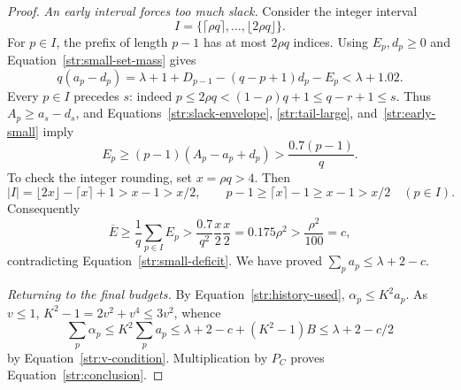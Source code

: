 \begin{proof}
\textit{An early interval forces too much slack.}
Consider the integer interval
\[
 I=\{\lceil\rho q\rceil,\ldots,\lfloor2\rho q\rfloor\}.
\]
For $p\in I$, the prefix of length $p-1$ has at most $2\rho q$ indices.
Using $E_p,d_p\ge0$ and Equation~\eqref{str:small-set-mass} gives
\begin{equation}\label{str:early-small}
 q(a_p-d_p)=\lambda+1+D_{p-1}-(q-p+1)d_p-E_p
 <\lambda+1.02.
\end{equation}
Every $p\in I$ precedes $s$: indeed
$p\le2\rho q<(1-\rho)q+1\le q-r+1\le s$.
Thus $A_p\ge a_s-d_s$, and Equations~\eqref{str:slack-envelope},
\eqref{str:tail-large}, and~\eqref{str:early-small} imply
\[
 E_p\ge(p-1)(A_p-a_p+d_p)>\frac{0.7(p-1)}q.
\]
To check the integer rounding, set $x=\rho q>4$.
Then
\[
 |I|=\lfloor2x\rfloor-\lceil x\rceil+1>x-1>x/2,
 \qquad p-1\ge\lceil x\rceil-1\ge x-1>x/2
 \quad(p\in I).
\]
Consequently
\[
 \overline E\ge\frac1q\sum_{p\in I}E_p
 >\frac{0.7}{q^2}\frac{x}{2}\frac{x}{2}
 =0.175\rho^2>\frac{\rho^2}{100}=c,
\]
contradicting Equation~\eqref{str:small-deficit}.  We have proved
$\sum_pa_p\le\lambda+2-c$.

\textit{Returning to the final budgets.}
By Equation~\eqref{str:history-used}, $\alpha_p\le K^2a_p$.
As $v\le1$, $K^2-1=2v^2+v^4\le3v^2$, whence
\[
 \sum_p\alpha_p
 \le K^2\sum_pa_p
 \le\lambda+2-c+(K^2-1)B
 \le\lambda+2-c/2
\]
by Equation~\eqref{str:v-condition}.  Multiplication by $P_C$ proves
Equation~\eqref{str:conclusion}.
\end{proof}
